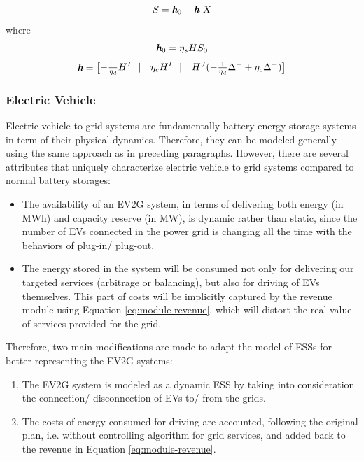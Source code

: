 \begin{equation}
\label{eq:state-ESS-M-1}
S = \textit{\textbf{h}}_0 + \textit{\textbf{h}}~X
\end{equation}
where
\begin{equation}
\label{eq:state-ESS-M-2}
\textit{\textbf{h}}_0 =  \eta_s H S_0
\end{equation}
\begin{equation}
\label{eq:state-ESS-M-3}
\textit{\textbf{h}} = \begin{bmatrix}
-\frac{1}{\eta_d} H^I~~|& \eta_c H^I~~|& H^J (-\frac{1}{\eta_d} \Delta^{+} + \eta_c \Delta^{-})
\end{bmatrix}
\end{equation}
\subsubsection{Electric Vehicle}
Electric vehicle to grid systems are fundamentally battery energy storage systems in term of their physical dynamics. Therefore, they can be modeled generally using the same approach as in preceding paragraphs. However, there are several attributes that uniquely characterize electric vehicle to grid systems compared to normal battery storages:

\begin{itemize}
	\item The availability of an EV2G system, in terms of delivering both energy (in MWh) and capacity reserve (in MW), is dynamic rather than static, since the number of EVs connected in the power grid is changing all the time with the behaviors of plug-in/ plug-out.
	\item The energy stored in the system will be consumed not only for delivering our targeted services (arbitrage or balancing), but also for driving of EVs themselves. This part of costs will be implicitly captured by the revenue module using Equation \eqref{eq:module-revenue}, which will distort the real value of services provided for the grid. 
\end{itemize}

Therefore, two main modifications are made to adapt the model of ESSs for better representing the EV2G systems: 

\begin{enumerate}
	\item The EV2G system is modeled as a dynamic ESS by taking into consideration the connection/ disconnection of EVs to/ from the grids.
	\item The costs of energy consumed for driving are accounted, following the original plan, i.e. without controlling algorithm for grid services, and added back to the revenue in Equation \eqref{eq:module-revenue}.
\end{enumerate}

